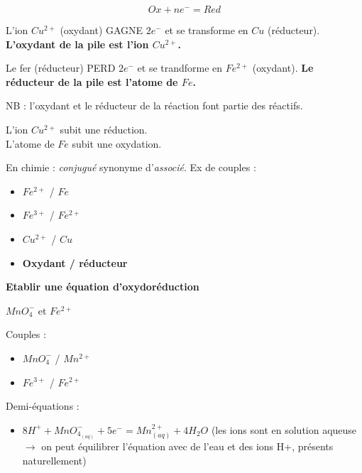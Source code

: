 \documentclass[12pt]{article}
\begin{document}
\[Ox + ne^- = Red\]

L'ion $Cu^{2+}$ (oxydant) GAGNE $2e^-$ et se transforme en $Cu$ (réducteur).
\textbf{L'oxydant de la pile est l'ion $Cu^{2+}$.}

Le fer (réducteur) PERD $2e^-$ et se trandforme en $Fe^{2+}$ (oxydant).
\textbf{Le réducteur de la pile est l'atome de $Fe$.}

NB : l'oxydant et le réducteur de la réaction font partie des réactifs.

L'ion $Cu^{2+}$ subit une réduction.\\
L'atome de $Fe$ subit une oxydation.

En chimie : \emph{conjugué} synonyme d'\emph{associé}. Ex de couples :
\begin{itemize}
\item $Fe^{2+}$ / $Fe$
\item $Fe^{3+}$ / $Fe^{2+}$
\item $Cu^{2+}$ / $Cu$
\item \textbf{Oxydant / réducteur}
\end{itemize}

\textbf{Etablir une équation d'oxydoréduction}

$MnO_4^-$ et $Fe^{2+}$

Couples :
\begin{itemize}
\item \textbf{$MnO_4^-$} / $Mn^{2+}$
\item $Fe^{3+}$ / \textbf{$Fe^{2+}$}
\end{itemize}

Demi-équations :
\begin{itemize}
\item $8H^+ + MnO_{4_{(aq)}}^- + 5e^- = Mn^{2+}_{(aq)} + 4H_2O$ (les ions sont en solution aqueuse $\rightarrow$ on peut équilibrer l'équation avec de l'eau et des ions H+, présents naturellement)
\end{itemize}
\end{document}
